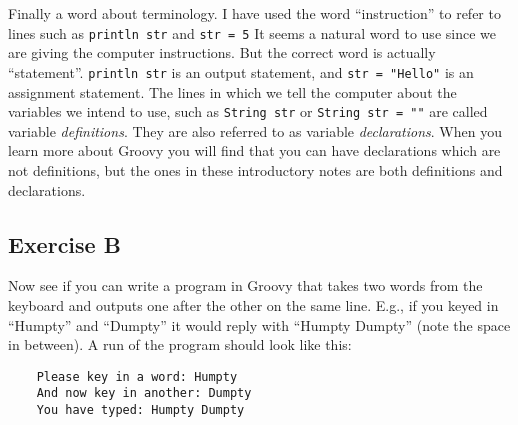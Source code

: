 Finally a word about terminology.  I have used the word ``instruction''
to refer to lines such as \verb!println str! and \verb!str = 5!
It seems a natural word to use since we are giving the computer instructions.
But the correct word is actually ``statement''.  \verb!println str! is
an output statement, and \verb!str = "Hello"! is an assignment statement.
The lines in which we tell the computer about the variables we intend to
use, such as \verb!String str! or \verb!String str = ""! are called
variable \emph{definitions}.  They are also referred to as 
variable \emph{declarations}.  When you learn more about Groovy you will
find that you can have declarations which are not definitions, but the
ones in these introductory notes are both definitions and declarations.

\subsection*{Exercise B}

Now see if you can write a program in Groovy that takes
two words from the keyboard and outputs one after the other on the same line. 
E.g., if you keyed in ``Humpty'' and ``Dumpty'' 
it would reply with ``Humpty Dumpty'' (note the space in between).
A run of the program should look like this:

\begin{Verbatim}
    Please key in a word: Humpty
    And now key in another: Dumpty
    You have typed: Humpty Dumpty
\end{Verbatim}


 	


